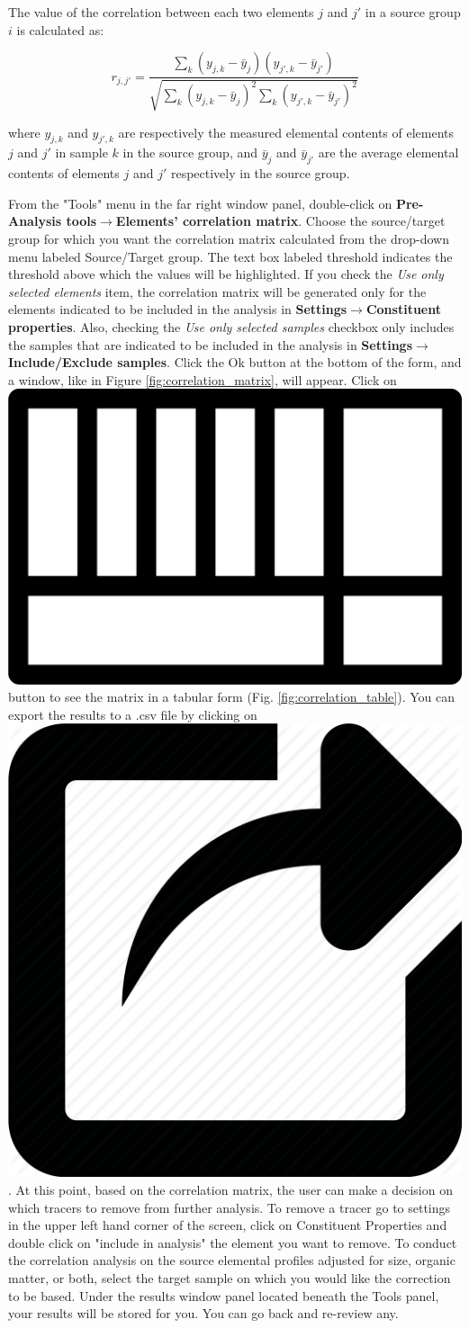 \documentclass[12pt]{report}
\begin{document}
The value of the correlation between each two elements $j$ and $j'$ in a source group $i$ is calculated as: 


\begin{equation}
    r_{j,j'} = \frac{\sum\limits_{k}^{} (y_{j,k}-\bar{y}_j)(y_{j',k}-\bar{y}_{j'})}{\sqrt{\sum\limits_{k}^{}(y_{j,k}-\bar{y}_j)^2\sum\limits_{k}^{}(y_{j',k}-\bar{y}_{j'})^2}}
\end{equation}

where $y_{j,k}$ and $y_{j',k}$ are respectively the measured elemental contents of elements $j$ and $j'$ in sample $k$ in the source group, and $\bar{y}_j$ and $\bar{y}_{j'}$ are the average elemental contents of elements $j$ and $j'$ respectively in the source group. 

From the "Tools" menu in the far right window panel, double-click on \textbf{Pre-Analysis tools}$\rightarrow$\textbf{Elements' correlation matrix}. Choose the source/target group for which you want the correlation matrix calculated from the drop-down menu labeled Source/Target group. The text box labeled threshold indicates the threshold above which the values will be highlighted. If you check the \textit{Use only selected elements} item, the correlation matrix will be generated only for the elements indicated to be included in the analysis in \textbf{Settings}$\rightarrow$\textbf{Constituent properties}. Also, checking the \textit{Use only selected samples} checkbox only includes the samples that are indicated to be included in the analysis in \textbf{Settings}$\rightarrow$\textbf{Include/Exclude samples}. Click the Ok button at the bottom of the form, and a window, like in Figure \ref{fig:correlation_matrix}, will appear. Click on \includegraphics[width=0.5 cm]{Figures/table.png} button to see the matrix in a tabular form (Fig. \ref{fig:correlation_table}). You can export the results to a .csv file by clicking on \includegraphics[width=0.5 cm]{Figures/export.png}. At this point, based on the correlation matrix, the user can make a decision on which tracers to remove from further analysis.  To remove a tracer go to settings in the upper left hand corner of the screen, click on  Constituent Properties and  double click on "include in analysis" the element you want to remove. To conduct the correlation analysis on the source elemental profiles adjusted for size, organic matter, or both, select the target sample on which you would like the correction to be based.  Under the results window panel located beneath the Tools panel, your results will be stored for you. You can go back and re-review any. 
\end{document}
